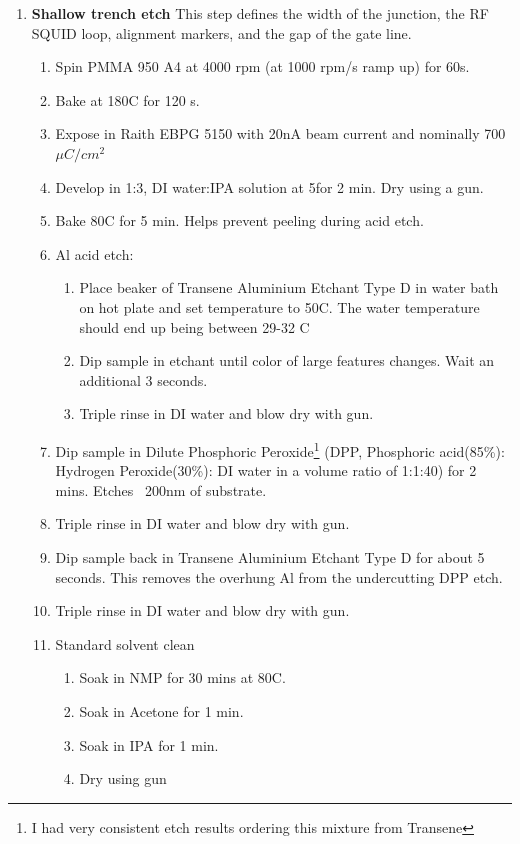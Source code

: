 \begin{enumerate}
\begin{enumerate}
        \end{enumerate}
    \item \textbf{Shallow trench etch} This step defines the width of the junction, the RF SQUID loop, alignment markers, and the gap of the gate line.
        \begin{enumerate}
            \item Spin PMMA 950 A4 at 4000 rpm (at 1000 rpm/s ramp up) for 60s.
            \item Bake at 180\degree C for 120 s.
            \item Expose in Raith EBPG 5150 with 20nA beam current and nominally 700 $\mu C/cm^2 $
            \item Develop in  1:3, DI water:IPA solution at 5\degree for 2 min. Dry using a  gun.
            \item Bake 80\degree C for 5 min. Helps prevent peeling during acid etch.
            \item Al acid etch:
            \begin{enumerate}
                \item Place beaker of Transene Aluminium Etchant Type D in water bath on hot plate and set temperature to 50\degree C. The water temperature should end up being between 29-32 \degree C
                \item Dip sample in etchant until color of large features changes. Wait an additional 3 seconds.
                \item Triple rinse in DI water and blow dry with  gun.
            \end{enumerate}
            \item Dip sample in Dilute Phosphoric Peroxide\footnote{I had very consistent etch results ordering this mixture from Transene} (DPP, Phosphoric acid(85\%): Hydrogen Peroxide(30\%): DI water in a volume ratio of 1:1:40) for 2 mins. Etches ~200nm of substrate.
            \item Triple rinse in DI water and blow dry with  gun.
            \item Dip sample back in Transene Aluminium Etchant Type D for about 5 seconds. This removes the overhung Al from the undercutting DPP etch.
            \item Triple rinse in DI water and blow dry with  gun.
            \item Standard solvent clean
            \begin{enumerate}
                \item Soak in NMP for 30 mins at 80\degree C.
                \item Soak in Acetone for 1 min.
                \item Soak in IPA for 1 min.
                \item Dry using  gun
                

\end{enumerate}
\end{enumerate}
\end{enumerate}
